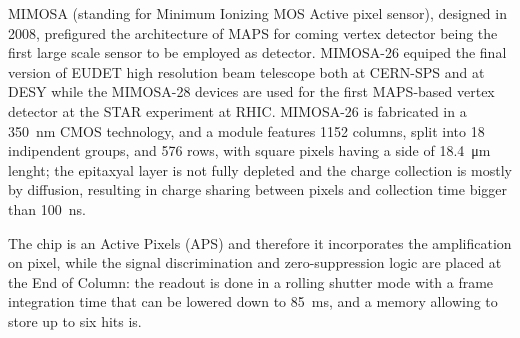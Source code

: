         MIMOSA \cite{MIMOSA}\cite{MIMOSA26} (standing for Minimum Ionizing MOS Active pixel sensor), designed in 2008, prefigured the architecture of MAPS for coming vertex detector being the first large scale sensor to be employed as detector. MIMOSA-26 equiped the final version of EUDET high resolution  beam telescope both at CERN-SPS and at DESY while the MIMOSA-28 devices are used for the first MAPS-based vertex detector at the STAR experiment at RHIC.
        MIMOSA-26 is fabricated in a \SI{350}{nm} CMOS technology, and a module features 1152 columns, split into 18 indipendent groups, and 576 rows, with square pixels having a side of \SI{18.4}{\um} lenght; the epitaxyal layer is not fully depleted and the charge collection is mostly by diffusion, resulting in charge sharing between pixels and collection time bigger than \SI{100}{ns}.

        The chip is an Active Pixels (APS) and therefore it incorporates the amplification on pixel, while the signal discrimination and zero-suppression logic are placed at the End of Column: the readout is done in a rolling shutter mode with a frame integration time that can be lowered down to \SI{85}{ms}, and a memory allowing to store up to six hits is. 


